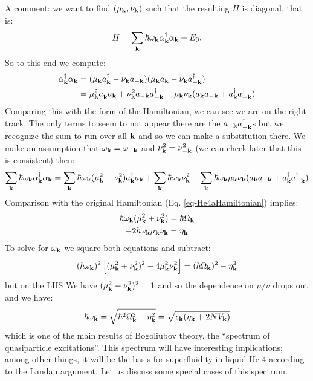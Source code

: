 A comment: we want to find $(\mu_{\mathbf{k}}, \nu_{\mathbf{k}})$ such that the resulting $H$ is diagonal, that is:
\begin{equation}
    H = \sum_{\mathbf{k}}\hbar \omega_{\mathbf{k}}\alpha^\dagger_{\mathbf{k}}\alpha_{\mathbf{k}} + E_0.
\end{equation}
So to this end we compute:
\begin{equation}
    \begin{split}
        \alpha^\dagger_{\mathbf{k}}\alpha_{\mathbf{k}} &= (\mu_{\mathbf{k}}a^\dagger_{\mathbf{k}} - \nu_{\mathbf{k}}a_{-\mathbf{k}})(\mu_{\mathbf{k}}a_{\mathbf{k}} - \nu_{\mathbf{k}}a^\dagger_{-\mathbf{k}})
        \\ &= \mu_{\mathbf{k}}^2a^\dagger_{\mathbf{k}}a_{\mathbf{k}} + \nu_{\mathbf{k}}^2a_{-\mathbf{k}}a^\dagger_{-\mathbf{k}} - \mu_{\mathbf{k}}\nu_{\mathbf{k}}(a_{\mathbf{k}}a_{-\mathbf{k}} + a^\dagger_{\mathbf{k}}a^\dagger_{-\mathbf{k}})
    \end{split}
\end{equation}
Comparing this with the form of the Hamiltonian, we can see we are on the right track. The only terms to seem to not appear there are the $a_{-\mathbf{k}}a^\dagger_{-\mathbf{k}}$s but we recognize the sum to run over all $\mathbf{k}$ and so we can make a substitution there. We make an assumption that $\omega_{\mathbf{k}} = \omega_{-\mathbf{k}}$ and $\nu_{\mathbf{k}}^2 = \nu_{-\mathbf{k}}^2$ (we can check later that this is consistent) then:
\begin{equation}
    \sum_{\mathbf{k}}\hbar \omega_{\mathbf{k}}\alpha^\dagger_{\mathbf{k}}\alpha_{\mathbf{k}} =  \sum_{\mathbf{k}}\hbar \omega_{\mathbf{k}}(\mu_{\mathbf{k}}^2 + \nu_{\mathbf{k}}^2)a^\dagger_{\mathbf{k}}a_{\mathbf{k}} + \sum_{\mathbf{k}}\hbar \omega_{\mathbf{k}}\nu_{\mathbf{k}}^2 - \sum_{\mathbf{k}}\hbar \omega_{\mathbf{k}}\mu_{\mathbf{k}}\nu_{\mathbf{k}}(a_{\mathbf{k}}a_{-\mathbf{k}} + a^\dagger_{\mathbf{k}}a^\dagger_{-\mathbf{k}})
\end{equation}
Comparison with the original Hamiltonian (Eq. \eqref{eq-He4aHamiltonian}) implies:
\begin{equation}
    \begin{split}
        \hbar \omega_{\mathbf{k}}(\mu_{\mathbf{k}}^2 + \nu_{\mathbf{k}}^2) &= \hbar \Omega_{\mathbf{k}}
    \\ -2\hbar \omega_{\mathbf{k}}\mu_{\mathbf{k}}\nu_{\mathbf{k}} &= \eta_{\mathbf{k}}
    \end{split}
\end{equation}
To solve for $\omega_{\mathbf{k}}$ we square both equations and subtract:
\begin{align*}
    (\hbar \omega_{\mathbf{k}})^2\left[(\mu_{\mathbf{k}}^2 + \nu_{\mathbf{k}}^2)^2 - 4\mu_{\mathbf{k}}^2\nu_{\mathbf{k}}^2\right] = (\hbar\Omega_{\mathbf{k}})^2 - \eta_{\mathbf{k}}^2
\end{align*}
but on the LHS We have $(\mu_{\mathbf{k}}^2 - \nu_{\mathbf{k}}^2)^2 = 1$ and so the dependence on $\mu/\nu$ drops out and we have:
\begin{equation}
    \hbar\omega_{\mathbf{k}} = \sqrt{\hbar^2\Omega_{\mathbf{k}}^2 - \eta_{\mathbf{k}}^2} = \sqrt{\epsilon_{\mathbf{k}}(\eta_{\mathbf{k}} + 2NV_{\mathbf{k}})}
\end{equation}
which is one of the main results of Bogoliubov theory, the ``spectrum of quasiparticle excitations''. This spectrum will have interesting implications; among other things, it will be the basis for superfluidity in liquid He-4 according to the Landau argument. Let us discuss some special cases of this spectrum. 

